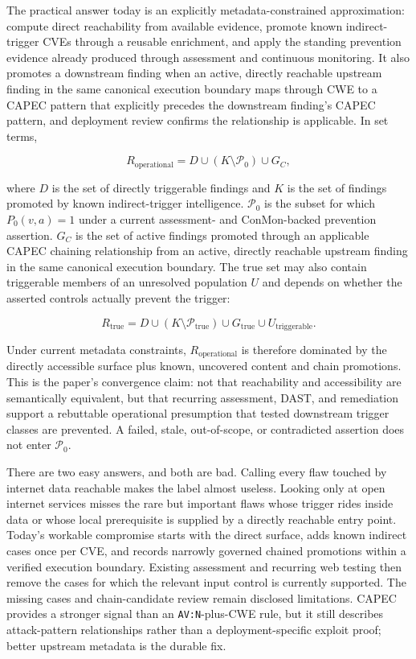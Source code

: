 \documentclass[11pt]{article}
\newcommand{\code}[1]{\texttt{#1}}
\begin{document}
The practical answer today is an explicitly metadata-constrained
approximation: compute direct reachability from available evidence, promote
known indirect-trigger CVEs through a reusable enrichment, and apply the
standing prevention evidence already produced through assessment and
continuous monitoring. It also promotes a downstream finding when an active,
directly reachable upstream finding in the same canonical execution boundary
maps through CWE to a CAPEC pattern that explicitly precedes the downstream
finding's CAPEC pattern, and deployment review confirms the relationship is
applicable. In set terms,

\[
R_{\mathrm{operational}}=D\cup(K\setminus\mathcal P_0)\cup G_C,
\]

where $D$ is the set of directly triggerable findings and $K$ is the set of
findings promoted by known indirect-trigger intelligence. $\mathcal P_0$ is the
subset for which $P_0(v,a)=1$ under a current assessment- and ConMon-backed
prevention assertion. $G_C$ is the set of active findings promoted through an
applicable CAPEC chaining relationship from an active, directly reachable
upstream finding in the same canonical execution boundary. The
true set may also contain triggerable members of an unresolved population $U$
and depends on whether the asserted controls actually prevent the trigger:

\[
R_{\mathrm{true}}=D\cup(K\setminus\mathcal P_{\mathrm{true}})
\cup G_{\mathrm{true}}\cup U_{\mathrm{triggerable}}.
\]

Under current metadata constraints, $R_{\mathrm{operational}}$ is therefore
dominated by the directly accessible surface plus known, uncovered content and
chain promotions. This is the paper's convergence claim: not that reachability
and accessibility are semantically equivalent, but that recurring assessment,
DAST, and remediation support a rebuttable operational presumption that tested
downstream trigger classes are prevented. A failed, stale, out-of-scope, or
contradicted assertion does not enter $\mathcal P_0$.

\begin{plain}
There are two easy answers, and both are bad. Calling every flaw touched by
internet data reachable makes the label almost useless. Looking only at open
internet services misses the rare but important flaws whose trigger rides
inside data or whose local prerequisite is supplied by a directly reachable
entry point. Today's workable compromise starts with the direct surface, adds
known indirect cases once per CVE, and records narrowly governed chained
promotions within a verified execution boundary. Existing assessment and
recurring web testing then remove the cases for which the relevant input
control is currently supported. The missing cases and chain-candidate review
remain disclosed limitations. CAPEC provides a stronger signal than an
\code{AV:N}-plus-CWE rule, but it still describes attack-pattern relationships
rather than a deployment-specific exploit proof; better upstream metadata is
the durable fix.
\end{plain}
\end{document}
